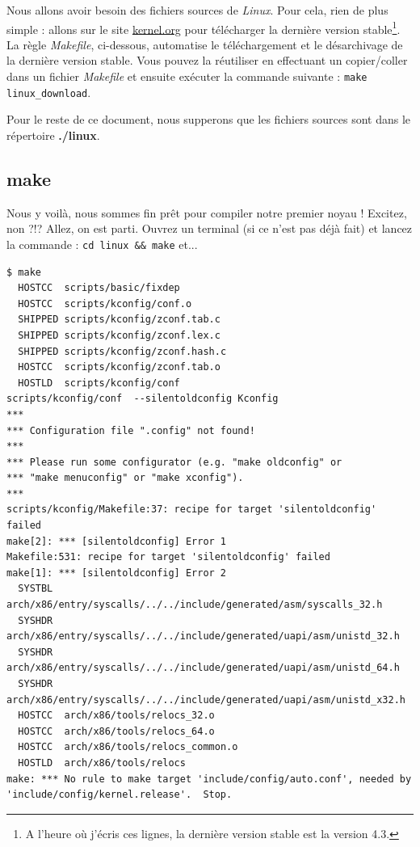 \documentclass[a4paper]{article}
\begin{document}
Nous allons avoir besoin des fichiers sources de \textit{Linux}. Pour cela, rien de plus simple : allons sur le site \href{http://www.kernel.org}{kernel.org} pour télécharger la dernière version stable\footnote{A l'heure où j'écris ces lignes, la dernière version stable est la version 4.3.}.\\

La règle \textit{Makefile}, ci-dessous, automatise le téléchargement et le désarchivage de la dernière version stable. Vous pouvez la réutiliser en effectuant un copier/coller dans un fichier \textit{Makefile} et ensuite exécuter la commande suivante : \lstset{language=sh}\lstinline{make linux_download}.\\

\lstset{language=make}


Pour le reste de ce document, nous supperons que les fichiers sources sont dans le répertoire \textbf{./linux}.\\

\subsection{make}

Nous y voilà, nous sommes fin prêt pour compiler notre premier noyau ! Excitez, non ?!? Allez, on est parti. Ouvrez un terminal (si ce n'est pas déjà fait) et lancez la commande : \lstset{language=sh}\lstinline{cd linux && make} et...

\begin{verbatim}
$ make
  HOSTCC  scripts/basic/fixdep
  HOSTCC  scripts/kconfig/conf.o
  SHIPPED scripts/kconfig/zconf.tab.c
  SHIPPED scripts/kconfig/zconf.lex.c
  SHIPPED scripts/kconfig/zconf.hash.c
  HOSTCC  scripts/kconfig/zconf.tab.o
  HOSTLD  scripts/kconfig/conf
scripts/kconfig/conf  --silentoldconfig Kconfig
***
*** Configuration file ".config" not found!
***
*** Please run some configurator (e.g. "make oldconfig" or
*** "make menuconfig" or "make xconfig").
***
scripts/kconfig/Makefile:37: recipe for target 'silentoldconfig' failed
make[2]: *** [silentoldconfig] Error 1
Makefile:531: recipe for target 'silentoldconfig' failed
make[1]: *** [silentoldconfig] Error 2
  SYSTBL  arch/x86/entry/syscalls/../../include/generated/asm/syscalls_32.h
  SYSHDR  arch/x86/entry/syscalls/../../include/generated/uapi/asm/unistd_32.h
  SYSHDR  arch/x86/entry/syscalls/../../include/generated/uapi/asm/unistd_64.h
  SYSHDR  arch/x86/entry/syscalls/../../include/generated/uapi/asm/unistd_x32.h
  HOSTCC  arch/x86/tools/relocs_32.o
  HOSTCC  arch/x86/tools/relocs_64.o
  HOSTCC  arch/x86/tools/relocs_common.o
  HOSTLD  arch/x86/tools/relocs
make: *** No rule to make target 'include/config/auto.conf', needed by 'include/config/kernel.release'.  Stop.
\end{verbatim}
\end{document}
